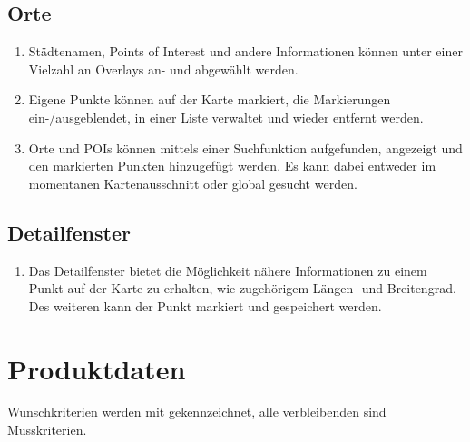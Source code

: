 \documentclass[10pt]{scrreprt}
\begin{document}
\section{Orte}
\begin{enumerate}[leftmargin=2cm,resume]
\item Städtenamen, Points of Interest und andere Informationen können unter einer Vielzahl an Overlays an- und abgewählt werden.
\item \W Eigene Punkte können auf der Karte markiert, die Markierungen ein-/ausgeblendet, in einer Liste verwaltet und wieder entfernt werden.
\item \W Orte und POIs können mittels einer Suchfunktion aufgefunden, angezeigt und den markierten Punkten hinzugefügt werden. Es kann dabei entweder im momentanen Kartenausschnitt oder global gesucht werden.
\end{enumerate}

\section{Detailfenster}
\begin{enumerate}[leftmargin=2cm,resume]
\item Das Detailfenster bietet die Möglichkeit nähere Informationen zu einem Punkt auf der Karte zu erhalten, wie zugehörigem Längen- und Breitengrad. Des weiteren kann der Punkt markiert und gespeichert werden.
\end{enumerate}



\chapter{Produktdaten}

\renewcommand{\labelenumi}{\textbf{/D\numprint{\theenumi}0/}}
Wunschkriterien werden mit \W  gekennzeichnet, alle verbleibenden sind Musskriterien.
\end{document}
